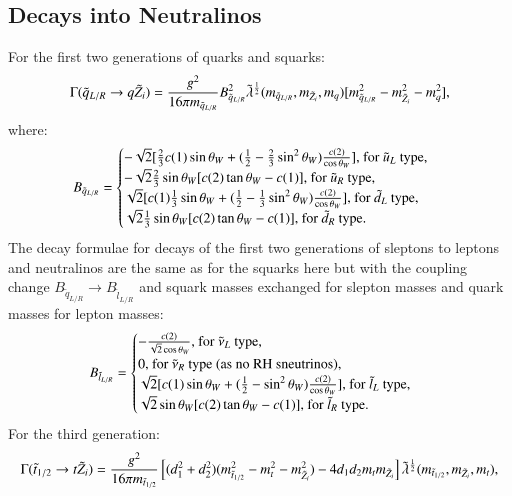 \documentclass[final,3p,times]{elsarticle}
\begin{document}
\subsection{Decays into Neutralinos}
For the first two generations of quarks and squarks:
\begin{equation} \label{qLRqneutNMSSM}
\Gamma(\tilde{q}_{L/R} \rightarrow q \tilde{Z}_i) = {g^2 \over 16\pi m_{\tilde{q}_{L/R}}} B_{\tilde{q}_{L/R}}^2 \tilde{\lambda}^{1 \over 2}(m_{\tilde{q}_{L/R}},m_{\tilde{Z}_i},m_q) [m_{\tilde{q}_{L/R}}^2 - m_{\tilde{Z}_i}^2 - m_{q}^2],
\end{equation}
where:
\begin{equation}
B_{\tilde{q}_{L/R}} = \begin{cases}
	-\sqrt{2}[{2 \over 3}c(1)\sin\theta_W + ({1 \over 2} - {2 \over 3}\sin^2 \theta_W){c(2) \over \cos\theta_W}] $, for $\tilde{u}_L$ type, $ \\
	-\sqrt{2} {2 \over 3} \sin\theta_W [c(2) \tan\theta_W - c(1)] $, for $\tilde{u}_R$ type, $ \\
	\sqrt{2}[c(1){1 \over 3}\sin\theta_W + ({1 \over 2} - {1 \over 3}\sin^2 \theta_W){c(2) \over \cos\theta_W}] $, for $\tilde{d}_L$ type, $ \\
	\sqrt{2} {1 \over 3} \sin\theta_W [c(2)\tan\theta_W - c(1)] $, for $\tilde{d}_R$ type$.\\
	\end{cases}
\end{equation}
The decay formulae for decays of the first two generations of sleptons to leptons and neutralinos are the same as for the squarks here but with the coupling change $B_{\tilde{q}_{L/R}} \rightarrow B_{\tilde{l}_{L/R}}$ and squark masses exchanged for slepton masses and quark masses for lepton masses:
\begin{equation}
B_{\tilde{l}_{L/R}} = \begin{cases}
	-{c(2) \over \sqrt{2} \cos\theta_W} $, for $\tilde{\nu}_L$ type, $ \\
	0 $, for $\tilde{\nu}_R$ type (as no RH sneutrinos), $ \\
	\sqrt{2}[c(1)\sin\theta_W + ({1 \over 2} - \sin^2 \theta_W){c(2) \over \cos\theta_W}] $, for $\tilde{l}_L$ type, $ \\
	\sqrt{2} \sin\theta_W [c(2)\tan\theta_W - c(1)] $, for $\tilde{l}_R$ type. $\\
	\end{cases}
\end{equation}
For the third generation:
\begin{equation} \label{sttneutNMSSM}
\Gamma(\tilde{t}_{1/2} \rightarrow t \tilde{Z}_i) = {g^2 \over 16 \pi m_{\tilde{t}_{1/2}}}\left[(d_{1}^2 + d_{2}^2)(m_{\tilde{t}_{1/2}}^2 - m_{t}^2 - m_{\tilde{Z}_i}^2) - 4d_{1}d_{2}m_{t}m_{\tilde{Z}_i}\right]\tilde{\lambda}^{1 \over 2}(m_{\tilde{t}_{1/2}},m_{\tilde{Z}_i},m_{t}),
\end{equation}
\end{document}
